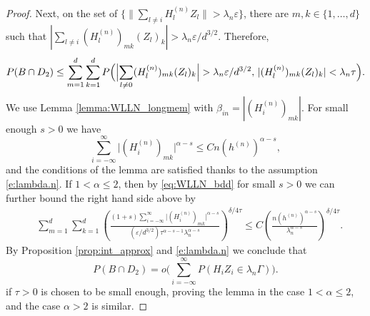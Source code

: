 \documentclass[11pt,reqno]{amsart}
\numberwithin{equation}{section}
\theoremstyle{definition}
\theoremstyle{remark}
\theoremstyle{definition}
\newcommand{\eps}{\varepsilon}
\begin{document}
\begin{proof}
Next, on the set of $\{\|\sum_{l \neq i} H_l^{(n)} Z_l\|> \lambda_n \eps\}$,
there are $m,k\in \{1,\ldots, d\}$ such that
$  |\sum_{l \neq i}(H_l^{(n)})_{mk} (Z_l)_k| > \lambda_n\eps/d^{3/2}$.
Therefore, 
\begin{align*}
     P(B\cap D_2)
    \leq \sum_{m = 1}^d\sum_{k = 1}^d P\Bigl( \Bigl|\sum_{l \neq 0}(H_l^{(n)})_{mk} (Z_l)_k\Bigr| >
  \lambda_n\eps/d^{3/2}, \, |(H_l^{(n)})_{mk} (Z_l)_k| < \lambda_n \tau
  \Bigr). 
\end{align*}
We use Lemma \ref{lemma:WLLN_longmem} with
$\beta_{in}=|(H_i^{(n)})_{mk}|$.  For small enough $s>0$ we have
$$
\sum_{i =-\infty}^\infty \big|(H_i^{(n)})_{mk}\big|^{\alpha - s}
\leq Cn(h^{(n)})^{\alpha - s},
$$
and the conditions of the lemma are satisfied
thanks to the assumption \eqref{e:lambda.n}. If $1<\alpha\leq 2$, then by \eqref{eq:WLLN_bdd}
for small $s> 0$ we can further bound the right hand side above by  
\begin{align*}
    & \sum_{m = 1}^d\sum_{k = 1}^d  \left(\frac{(1+s)\sum_{i =
      -\infty}^\infty \big|(H_i^{(n)})_{mk}\big|^{\alpha - s}}{ (\eps/d^{3/2})
      \tau^{\alpha-s-1} \lambda_n^{\alpha - s}}\right)^{\delta/4\tau}
      \leq C \left(\frac{n(h^{(n)})^{\alpha - s}}{\lambda_n^{\alpha  -
      s}}\right)^{\delta/4\tau}. 
\end{align*}
By Proposition \ref{prop:int_approx} and \eqref{e:lambda.n} we
conclude that
$$
P(B\cap D_2) = o\bigl( \sum_{i  =
  -\infty}^\infty P(H_iZ_i\in\lambda_n \Gamma)\bigr).
$$
if $\tau>0$ is chosen to be small enough, proving the lemma in the case
$1<\alpha\leq 2$, and the case $\alpha>2$ is similar. 
\end{proof}
\end{document}
